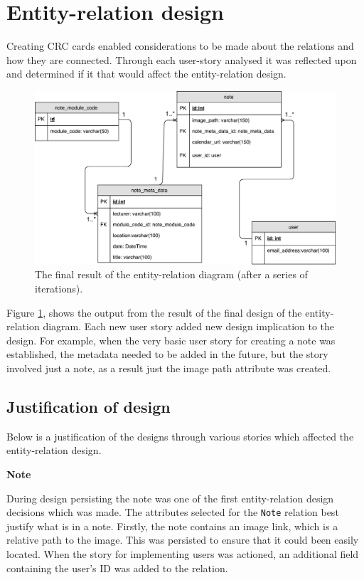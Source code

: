 \section{Entity-relation design}\label{section:er_diagram}
Creating CRC cards enabled considerations to be made about the relations and how they are connected. Through each user-story analysed it was reflected upon and determined if it that would affect the entity-relation design.

\begin{figure}[H]
  \centering
  \includegraphics[scale=0.5]{images/database_diagram.pdf}
  \caption{The final result of the entity-relation diagram (after a series of iterations).}
  \label{fig:database}
\end{figure}

Figure \ref{fig:database}, shows the output from the result of the final design of the entity-relation diagram. Each new user story added new design implication to the design. For example, when the very basic user story for creating a note was established, the metadata needed to be added in the future, but the story involved just a note, as a result just the image path attribute was created.

\subsection{Justification of design}
Below is a justification of the designs through various stories which affected the entity-relation design.

\noindent
\textbf{Note}

During design persisting the note was one of the first entity-relation design decisions which was made. The attributes selected for the \texttt{Note} relation best justify what is in a note. Firstly, the note contains an image link, which is a relative path to the image. This was persisted to ensure that it could been easily located. When the story for implementing users was actioned, an additional field containing the user's ID was added to the relation.

